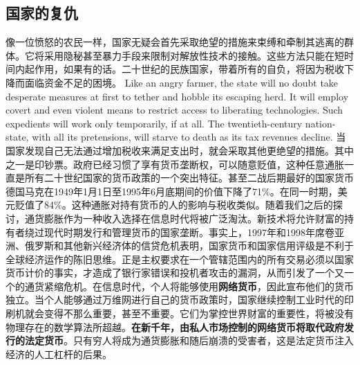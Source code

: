 \subsection{国家的复仇}
\begin{paracol}{2}[]
像一位愤怒的农民一样，国家无疑会首先采取绝望的措施来束缚和牵制其逃离的群体。它将采用隐秘甚至暴力手段来限制对解放性技术的接触。这些方法只能在短时间内起作用，如果有的话。二十世纪的民族国家，带着所有的自负，将因为税收下降而面临资金不足的困境。
\switchcolumn
Like an angry farmer, the state will no doubt take desperate measures at first to tether and hobble its escaping herd. It will employ covert and even violent means to restrict access to liberating technologies. Such expedients will work only temporarily, if at all. The twentieth-century nation-state, with all its pretensions, will starve to death as its tax revenues decline.
\switchcolumn*
当国家发现自己无法通过增加税收来满足支出时，就会采取其他更绝望的措施。其中之一是印钞票。政府已经习惯了享有货币垄断权，可以随意贬值，这种任意通胀一直是所有二十世纪国家的货币政策的一个突出特征。甚至二战后期最好的国家货币德国马克在1949年1月1日至1995年6月底期间的价值下降了71\%。在同一时期，美元贬值了84\%。这种通胀对持有货币的人的影响与税收类似。随着我们之后的探讨，通货膨胀作为一种收入选择在信息时代将被广泛淘汰。新技术将允许财富的持有者绕过现代时期发行和管理货币的国家垄断。事实上，1997年和1998年席卷亚洲、俄罗斯和其他新兴经济体的信贷危机表明，国家货币和国家信用评级是不利于全球经济运作的陈旧思维。正是主权要求在一个管辖范围内的所有交易必须以国家货币计价的事实，才造成了银行家错误和投机者攻击的漏洞，从而引发了一个又一个的通货紧缩危机。在信息时代，个人将能够使用\textbf{网络货币}，因此宣布他们的货币独立。当个人能够通过万维网进行自己的货币政策时，国家继续控制工业时代的印刷机就会变得不那么重要，甚至不重要。它们为掌控世界财富的重要性，将被没有物理存在的数学算法所超越。\textbf{在新千年，由私人市场控制的网络货币将取代政府发行的法定货币}。只有穷人将成为通货膨胀和随后崩溃的受害者，这是法定货币注入经济的人工杠杆的后果。
\switchcolumn

\end{paracol}
